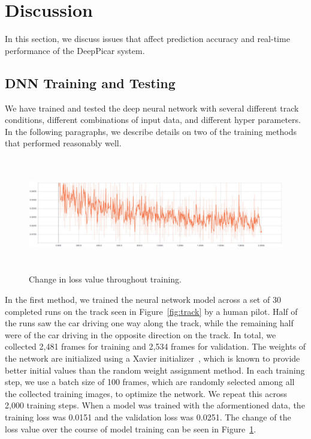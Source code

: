 \section{Discussion}\label{sec:discussion}

In this section, we discuss issues that affect prediction accuracy and
real-time performance of the DeepPicar system.

\subsection{DNN Training and Testing}
We have trained and tested the deep neural network with several
different track conditions, different combinations of input
data, and different hyper parameters. In the following paragraphs, we 
describe details on two of the training methods that performed 
reasonably well.

\begin{figure}[h]
  \centering
  \includegraphics[width=1.0\textwidth, height=5cm]{figs/TrainingLoss}
  \caption{Change in loss value throughout training.}
  \label{fig:modelloss}
\end{figure}

In the first method, we trained the neural network model across a set 
of 30 completed runs on the track seen in Figure~\ref{fig:track} by a
human pilot. Half of the runs saw the car driving one way along the
track, while the remaining half were of the car driving in the
opposite direction on the track.
In total, we collected 2,481 frames for training and 2,534 
frames for validation.
The weights of the network are initialized using a Xavier
initializer~\cite{Glorot2010}, which is known to provide better
initial values than the random weight assignment method.
In each training step, we use a batch
size of 100 frames, which are randomly selected among all the
collected training images, to optimize the network.
We repeat this across 2,000 training steps. When a model was trained
with the  aformentioned data, the training loss was 0.0151 and the
validation  loss was 0.0251.
The change of the loss value over the course of model training can be
seen in Figure~\ref{fig:modelloss}.

